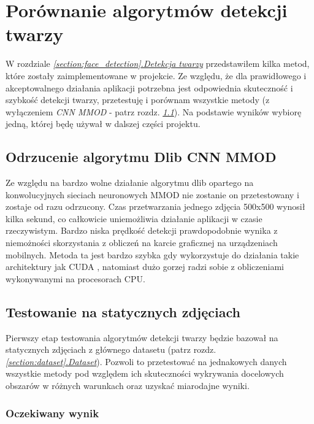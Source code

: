 \newpage

\section{Porównanie algorytmów detekcji twarzy}

W rozdziale \hyperref[{section:face_detection}]{\textit{\ref{section:face_detection}.Detekcja twarzy}} przedstawiłem kilka metod, które zostały zaimplementowane w projekcie. Ze względu, że dla prawidłowego i akceptowalnego działania aplikacji potrzebna jest odpowiednia skuteczność i szybkość detekcji twarzy, przetestuję i porównam wszystkie metody (z wyłączeniem \textit{CNN MMOD} - patrz rozdz. \hyperref[{section:no_cnn}]{\textit{\ref{section:no_cnn}}}). Na podstawie wyników wybiorę jedną, której będę używał w dalszej części projektu.


\subsection{Odrzucenie algorytmu Dlib CNN MMOD} \label{section:no_cnn}
Ze względu na bardzo wolne działanie algorytmu dlib opartego na konwolucyjnych sieciach neuronowych MMOD nie zostanie on przetestowany i zostaje od razu odrzucony. Czas przetwarzania jednego zdjęcia 500x500 wynosił kilka sekund, co całkowicie uniemożliwia działanie aplikacji w czasie rzeczywistym. Bardzo niska prędkość detekcji prawdopodobnie wynika z niemożności skorzystania z obliczeń na karcie graficznej na urządzeniach mobilnych. Metoda ta jest bardzo szybka gdy wykorzystuje do działania takie architektury jak CUDA \cite{nvidia_cuda}, natomiast dużo gorzej radzi sobie z obliczeniami wykonywanymi na procesorach CPU.

\subsection{Testowanie na statycznych zdjęciach}

Pierwszy etap testowania algorytmów detekcji twarzy będzie bazował na statycznych zdjęciach z głównego datasetu (patrz rozdz. \hyperref[section:dataset]{\textit{\ref{section:dataset}.Dataset}}). Pozwoli to przetestować na jednakowych danych wszystkie metody pod względem ich skuteczności wykrywania docelowych obszarów w różnych warunkach oraz uzyskać miarodajne wyniki.

\subsubsection{Oczekiwany wynik}

